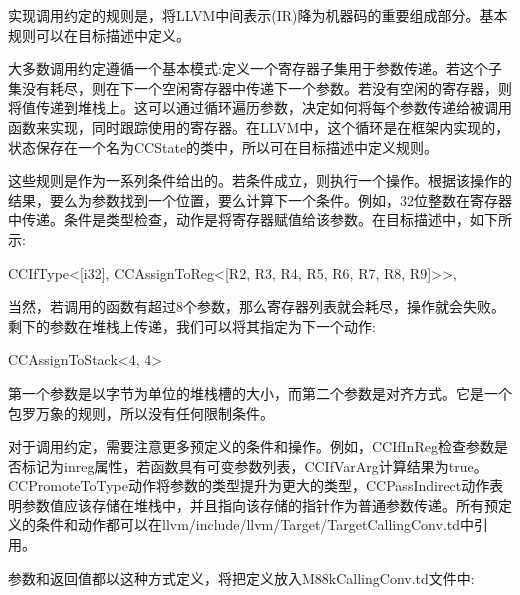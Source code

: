 
实现调用约定的规则是，将LLVM中间表示(IR)降为机器码的重要组成部分。基本规则可以在目标描述中定义。

大多数调用约定遵循一个基本模式:定义一个寄存器子集用于参数传递。若这个子集没有耗尽，则在下一个空闲寄存器中传递下一个参数。若没有空闲的寄存器，则将值传递到堆栈上。这可以通过循环遍历参数，决定如何将每个参数传递给被调用函数来实现，同时跟踪使用的寄存器。在LLVM中，这个循环是在框架内实现的，状态保存在一个名为CCState的类中，所以可在目标描述中定义规则。

这些规则是作为一系列条件给出的。若条件成立，则执行一个操作。根据该操作的结果，要么为参数找到一个位置，要么计算下一个条件。例如，32位整数在寄存器中传递。条件是类型检查，动作是将寄存器赋值给该参数。在目标描述中，如下所示:

\begin{shell}
CCIfType<[i32],
        CCAssignToReg<[R2, R3, R4, R5, R6, R7, R8, R9]>>,
\end{shell}

当然，若调用的函数有超过8个参数，那么寄存器列表就会耗尽，操作就会失败。剩下的参数在堆栈上传递，我们可以将其指定为下一个动作:

\begin{shell}
CCAssignToStack<4, 4>
\end{shell}

第一个参数是以字节为单位的堆栈槽的大小，而第二个参数是对齐方式。它是一个包罗万象的规则，所以没有任何限制条件。


对于调用约定，需要注意更多预定义的条件和操作。例如，CCIfInReg检查参数是否标记为inreg属性，若函数具有可变参数列表，CCIfVarArg计算结果为true。CCPromoteToType动作将参数的类型提升为更大的类型，CCPassIndirect动作表明参数值应该存储在堆栈中，并且指向该存储的指针作为普通参数传递。所有预定义的条件和动作都可以在llvm/include/llvm/Target/TargetCallingConv.td中引用。

参数和返回值都以这种方式定义，将把定义放入M88kCallingConv.td文件中:

